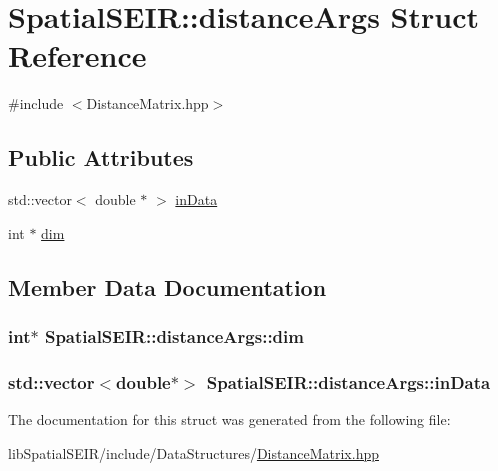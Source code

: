\hypertarget{structSpatialSEIR_1_1distanceArgs}{\section{Spatial\-S\-E\-I\-R\-:\-:distance\-Args Struct Reference}
\label{structSpatialSEIR_1_1distanceArgs}
}


{\ttfamily \#include $<$Distance\-Matrix.\-hpp$>$}

\subsection*{Public Attributes}
\begin{DoxyCompactItemize}
\item 
std\-::vector$<$ double $\ast$ $>$ \hyperlink{structSpatialSEIR_1_1distanceArgs_a7f9cbfeb6d9812f3328a0de341a0488f}{in\-Data}
\item 
int $\ast$ \hyperlink{structSpatialSEIR_1_1distanceArgs_a9ec648afe9d6177599f9fe68f05df837}{dim}
\end{DoxyCompactItemize}


\subsection{Member Data Documentation}
\hypertarget{structSpatialSEIR_1_1distanceArgs_a9ec648afe9d6177599f9fe68f05df837}{
\subsubsection[{dim}]{\setlength{\rightskip}{0pt plus 5cm}int$\ast$ Spatial\-S\-E\-I\-R\-::distance\-Args\-::dim}}\label{structSpatialSEIR_1_1distanceArgs_a9ec648afe9d6177599f9fe68f05df837}
\hypertarget{structSpatialSEIR_1_1distanceArgs_a7f9cbfeb6d9812f3328a0de341a0488f}{
\subsubsection[{in\-Data}]{\setlength{\rightskip}{0pt plus 5cm}std\-::vector$<$double$\ast$$>$ Spatial\-S\-E\-I\-R\-::distance\-Args\-::in\-Data}}\label{structSpatialSEIR_1_1distanceArgs_a7f9cbfeb6d9812f3328a0de341a0488f}


The documentation for this struct was generated from the following file\-:\begin{DoxyCompactItemize}
\item 
lib\-Spatial\-S\-E\-I\-R/include/\-Data\-Structures/\hyperlink{DistanceMatrix_8hpp}{Distance\-Matrix.\-hpp}\end{DoxyCompactItemize}
